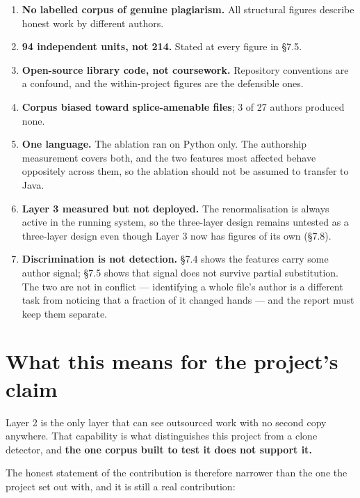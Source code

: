 \begin{enumerate}
\def\labelenumi{\arabic{enumi}.}
\tightlist
\item
  \textbf{No labelled corpus of genuine plagiarism.} All structural
  figures describe honest work by different authors.
\item
  \textbf{94 independent units, not 214.} Stated at every figure in
  \S{}7.5.
\item
  \textbf{Open-source library code, not coursework.} Repository
  conventions are a confound, and the within-project figures are the
  defensible ones.
\item
  \textbf{Corpus biased toward splice-amenable files}; 3 of 27 authors
  produced none.
\item
  \textbf{One language.} The ablation ran on Python only. The authorship
  measurement covers both, and the two features most affected behave
  oppositely across them, so the ablation should not be assumed to
  transfer to Java.
\item
  \textbf{Layer 3 measured but not deployed.} The renormalisation is
  always active in the running system, so the three-layer design remains
  untested as a three-layer design even though Layer 3 now has figures
  of its own (\S{}7.8).
\item
  \textbf{Discrimination is not detection.} \S{}7.4 shows the features
  carry some author signal; \S{}7.5 shows that signal does not survive
  partial substitution. The two are not in conflict --- identifying a
  whole file's author is a different task from noticing that a fraction
  of it changed hands --- and the report must keep them separate.
\end{enumerate}

\hypertarget{what-this-means-for-the-projects-claim}{%
\section{What this means for the project's
claim}\label{what-this-means-for-the-projects-claim}}

Layer 2 is the only layer that can see outsourced work with no second
copy anywhere. That capability is what distinguishes this project from a
clone detector, and \textbf{the one corpus built to test it does not
support it.}

The honest statement of the contribution is therefore narrower than the
one the project set out with, and it is still a real contribution:

